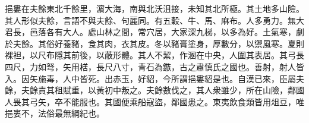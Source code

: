 
\begin{pinyinscope}
挹婁在夫餘東北千餘里，濵大海，南與北沃沮接，未知其北所極。其土地多山險。其人形似夫餘，言語不與夫餘、句麗同。有五糓、牛、馬、麻布。人多勇力。無大君長，邑落各有大人。處山林之間，常穴居，大家深九梯，以多為好。土氣寒，劇於夫餘。其俗好養豬，食其肉，衣其皮。冬以豬膏塗身，厚數分，以禦風寒。夏則裸袒，以尺布隱其前後，以蔽形體。其人不絜，作溷在中央，人圍其表居。其弓長四尺，力如弩，矢用楛，長尺八寸，青石為鏃，古之肅慎氏之國也。善射，射人皆入。因矢施毒，人中皆死。出赤玉，好貂，今所謂挹婁貂是也。自漢已來，臣屬夫餘，夫餘責其租賦重，以黃初中叛之。夫餘數伐之，其人衆雖少，所在山險，鄰國人畏其弓矢，卒不能服也。其國便乘船寇盜，鄰國患之。東夷飲食類皆用俎豆，唯挹婁不，法俗最無綱紀也。


\end{pinyinscope}